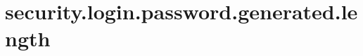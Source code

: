 \section{security.login.password.generated.length}
\label{configuration:SecurityLoginPasswordGeneratedLength}
\AvailableInJavaOnly{\TODO}